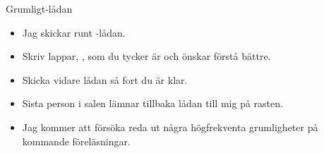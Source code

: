 \begin{Slide}{Grumligt-lådan}
\begin{itemize}
\item Jag skickar runt -lådan.
\item Skriv lappar, , som du tycker är  och  önskar förstå bättre.
\item Skicka vidare lådan så fort du är klar.
\item Sista person i salen lämnar tillbaka lådan till mig på rasten.
\item Jag kommer att försöka reda ut några högfrekventa grumligheter på kommande föreläsningar.
\end{itemize}
\end{Slide}
